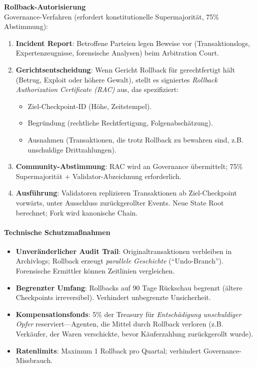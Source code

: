 \documentclass[11pt]{article}
\begin{document}
\textbf{Rollback-Autorisierung}\\
Governance-Verfahren (erfordert konstitutionelle Supermajorität, 75\% Abstimmung):
\begin{enumerate}[noitemsep]
  \item \textbf{Incident Report}: Betroffene Parteien legen Beweise vor (Transaktionslogs, Expertenzeugnisse, forensische Analysen) beim Arbitration Court.
  \item \textbf{Gerichtsentscheidung}: Wenn Gericht Rollback für gerechtfertigt hält (Betrug, Exploit oder höhere Gewalt), stellt es signiertes \emph{Rollback Authorization Certificate (RAC)} aus, das spezifiziert:
    \begin{itemize}[noitemsep]
      \item Ziel-Checkpoint-ID (Höhe, Zeitstempel).
      \item Begründung (rechtliche Rechtfertigung, Folgenabschätzung).
      \item Ausnahmen (Transaktionen, die trotz Rollback zu bewahren sind, z.B. unschuldige Drittzahlungen).
    \end{itemize}
  \item \textbf{Community-Abstimmung}: RAC wird an Governance übermittelt; 75\% Supermajorität + Validator-Abzeichnung erforderlich.
  \item \textbf{Ausführung}: Validatoren replizieren Transaktionen ab Ziel-Checkpoint vorwärts, unter Ausschluss zurückgerollter Events. Neue State Root berechnet; Fork wird kanonische Chain.
\end{enumerate}

\paragraph{Technische Schutzmaßnahmen}
\begin{itemize}[noitemsep]
  \item \textbf{Unveränderlicher Audit Trail}: Originaltransaktionen verbleiben in Archivlogs; Rollback erzeugt \emph{parallele Geschichte} (``Undo-Branch''). Forensische Ermittler können Zeitlinien vergleichen.
  \item \textbf{Begrenzter Umfang}: Rollbacks auf 90 Tage Rückschau begrenzt (ältere Checkpoints irreversibel). Verhindert unbegrenzte Unsicherheit.
  \item \textbf{Kompensationsfonds}: 5\% der Treasury für \emph{Entschädigung unschuldiger Opfer} reserviert—Agenten, die Mittel durch Rollback verloren (z.B. Verkäufer, der Waren verschickte, bevor Käuferzahlung zurückgerollt wurde).
  \item \textbf{Ratenlimits}: Maximum 1 Rollback pro Quartal; verhindert Governance-Missbrauch.
\end{itemize}
\end{document}
